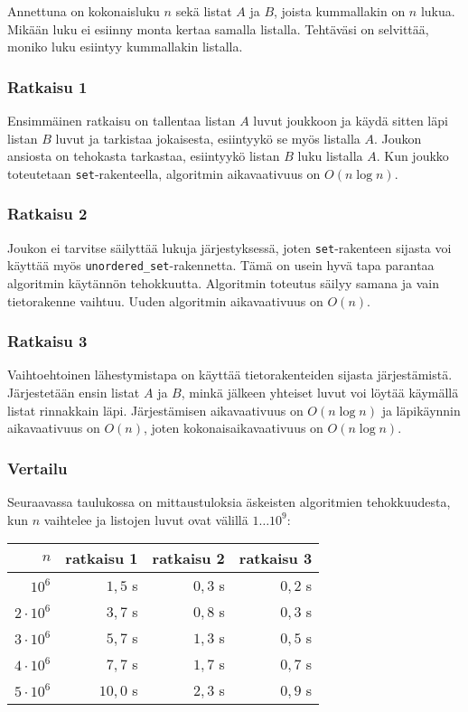 \begin{task}
Annettuna on kokonaisluku $n$ sekä listat $A$ ja $B$,
joista kummallakin on $n$ lukua.
Mikään luku ei esiinny monta kertaa samalla listalla.
Tehtäväsi on selvittää, moniko luku esiintyy
kummallakin listalla.
\end{task}

\subsubsection{Ratkaisu 1}

Ensimmäinen ratkaisu on tallentaa listan $A$ luvut joukkoon
ja käydä sitten läpi listan $B$ luvut ja
tarkistaa jokaisesta, esiintyykö se myös listalla $A$.
Joukon ansiosta on tehokasta tarkastaa,
esiintyykö listan $B$ luku listalla $A$.
Kun joukko toteutetaan \texttt{set}-rakenteella,
algoritmin aikavaativuus on $O(n \log n)$.

\subsubsection{Ratkaisu 2}

Joukon ei tarvitse säilyttää lukuja
järjestyksessä, joten
\texttt{set}-ra\-ken\-teen sijasta voi
käyttää myös \texttt{unordered\_set}-ra\-ken\-net\-ta.
Tämä on usein hyvä tapa parantaa algoritmin
käytännön tehokkuutta.
Algoritmin toteutus säilyy samana ja vain tietorakenne vaihtuu.
Uuden algoritmin aikavaativuus on $O(n)$.

\subsubsection{Ratkaisu 3}

Vaihtoehtoinen lähestymistapa on käyttää tietorakenteiden
sijasta järjestämistä.
Järjestetään ensin listat $A$ ja $B$,
minkä jälkeen yhteiset luvut voi löytää
käymällä listat rinnakkain läpi.
Järjestämisen aikavaativuus on $O(n \log n)$ ja
läpikäynnin aikavaativuus on $O(n)$,
joten kokonaisaikavaativuus on $O(n \log n)$.

\subsubsection{Vertailu}

Seuraavassa taulukossa on mittaustuloksia
äskeisten algoritmien tehokkuudesta,
kun $n$ vaihtelee ja listojen luvut ovat välillä $1 \ldots 10^9$:

\begin{center}
\begin{tabular}{rrrr}
$n$ & ratkaisu 1 & ratkaisu 2 & ratkaisu 3 \\
\hline
$10^6$ & $1{,}5$ s & $0{,}3$ s & $0{,}2$ s \\
$2 \cdot 10^6$ & $3{,}7$ s & $0{,}8$ s & $0{,}3$ s \\
$3 \cdot 10^6$ & $5{,}7$ s & $1{,}3$ s & $0{,}5$ s \\
$4 \cdot 10^6$ & $7{,}7$ s & $1{,}7$ s & $0{,}7$ s \\
$5 \cdot 10^6$ & $10{,}0$ s & $2{,}3$ s & $0{,}9$ s \\
\end{tabular}
\end{center}

